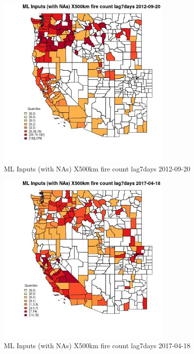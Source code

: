 \clearpage 

\begin{figure} 
\centering  
\includegraphics[width=0.77\textwidth]{Code_Outputs/Report_ML_input_PM25_Step4_part_e_de_duplicated_aves_compiled_2019-05-14wNAs_CountyX500km_fire_count_lag7daysMean2012-09-20_2012-09-20.jpg} 
\caption{\label{fig:Report_ML_input_PM25_Step4_part_e_de_duplicated_aves_compiled_2019-05-14wNAsCountyX500km_fire_count_lag7daysMean2012-09-20_2012-09-20}ML Inputs (with NAs) X500km fire count lag7days 2012-09-20} 
\end{figure} 
 

\begin{figure} 
\centering  
\includegraphics[width=0.77\textwidth]{Code_Outputs/Report_ML_input_PM25_Step4_part_e_de_duplicated_aves_compiled_2019-05-14wNAs_CountyX500km_fire_count_lag7daysMean2017-04-18_2017-04-18.jpg} 
\caption{\label{fig:Report_ML_input_PM25_Step4_part_e_de_duplicated_aves_compiled_2019-05-14wNAsCountyX500km_fire_count_lag7daysMean2017-04-18_2017-04-18}ML Inputs (with NAs) X500km fire count lag7days 2017-04-18} 
\end{figure} 
 

